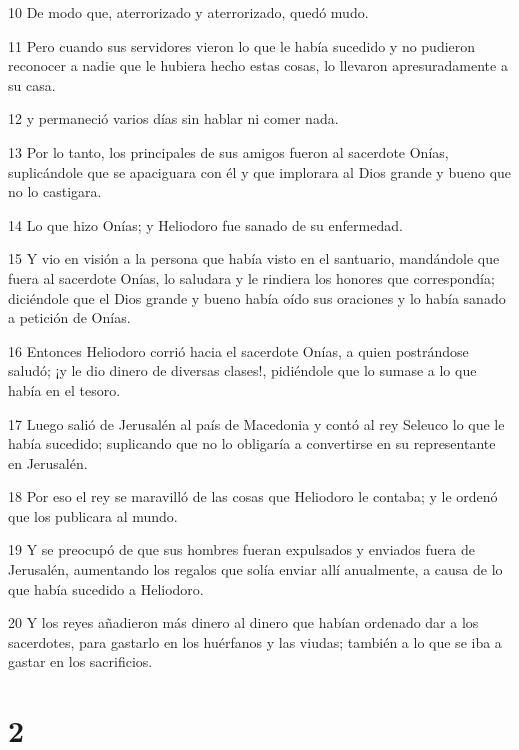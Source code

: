 \par 10 De modo que, aterrorizado y aterrorizado, quedó mudo.

\par 11 Pero cuando sus servidores vieron lo que le había sucedido y no pudieron reconocer a nadie que le hubiera hecho estas cosas, lo llevaron apresuradamente a su casa.

\par 12 y permaneció varios días sin hablar ni comer nada.

\par 13 Por lo tanto, los principales de sus amigos fueron al sacerdote Onías, suplicándole que se apaciguara con él y que implorara al Dios grande y bueno que no lo castigara.

\par 14 Lo que hizo Onías; y Heliodoro fue sanado de su enfermedad.

\par 15 Y vio en visión a la persona que había visto en el santuario, mandándole que fuera al sacerdote Onías, lo saludara y le rindiera los honores que correspondía; diciéndole que el Dios grande y bueno había oído sus oraciones y lo había sanado a petición de Onías.

\par 16 Entonces Heliodoro corrió hacia el sacerdote Onías, a quien postrándose saludó; ¡y le dio dinero de diversas clases!, pidiéndole que lo sumase a lo que había en el tesoro.

\par 17 Luego salió de Jerusalén al país de Macedonia y contó al rey Seleuco lo que le había sucedido; suplicando que no lo obligaría a convertirse en su representante en Jerusalén.

\par 18 Por eso el rey se maravilló de las cosas que Heliodoro le contaba; y le ordenó que los publicara al mundo.

\par 19 Y se preocupó de que sus hombres fueran expulsados ​​y enviados fuera de Jerusalén, aumentando los regalos que solía enviar allí anualmente, a causa de lo que había sucedido a Heliodoro.

\par 20 Y los reyes añadieron más dinero al dinero que habían ordenado dar a los sacerdotes, para gastarlo en los huérfanos y las viudas; también a lo que se iba a gastar en los sacrificios.

\chapter{2}

